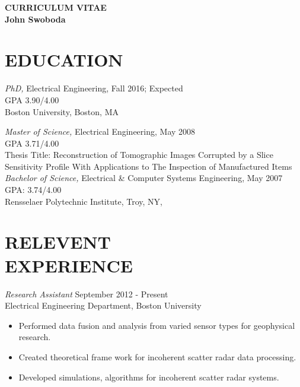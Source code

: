 
\thispagestyle{empty}

\begin{center}
{\LARGE {\bf CURRICULUM VITAE}}\\
\vspace{0.5in}
{\large {\bf John Swoboda}}
\end{center}

\section*{EDUCATION}{\sl PhD,} Electrical Engineering, Fall 2016; Expected \\
                GPA 3.90/4.00 \\
                Boston University, Boston, MA
	       

{\sl Master of Science,} Electrical Engineering, May 2008 \\
                 GPA 3.71/4.00\\
                Thesis Title: Reconstruction of Tomographic Images Corrupted by a Slice Sensitivity Profile With Applications to The Inspection of Manufactured Items\\
 {\sl Bachelor of Science,} Electrical \& Computer Systems Engineering, May 2007  \\
                GPA: 3.74/4.00\\
                Rensselaer Polytechnic Institute, Troy, NY, \\
                
 
 

 
\section*{RELEVENT \\ EXPERIENCE}
 {\sl Research Assistant} \hfill            September 2012 - Present \\
                Electrical Engineering Department, Boston University 
                 \begin{itemize}  \itemsep -2pt %
                 \item Performed data fusion and analysis from varied sensor types for geophysical research.
                 \item Created theoretical frame work for incoherent scatter radar data processing.
                 \item Developed simulations, algorithms for incoherent scatter radar systems.
                 \end{itemize} 

